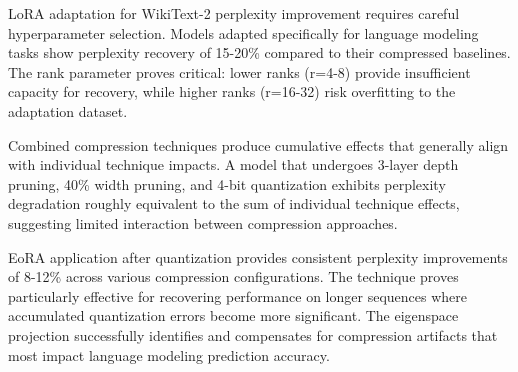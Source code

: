 LoRA adaptation for WikiText-2 perplexity improvement requires careful hyperparameter selection. Models adapted specifically for language modeling tasks show perplexity recovery of 15-20\% compared to their compressed baselines. The rank parameter proves critical: lower ranks (r=4-8) provide insufficient capacity for recovery, while higher ranks (r=16-32) risk overfitting to the adaptation dataset.

Combined compression techniques produce cumulative effects that generally align with individual technique impacts. A model that undergoes 3-layer depth pruning, 40\% width pruning, and 4-bit quantization exhibits perplexity degradation roughly equivalent to the sum of individual technique effects, suggesting limited interaction between compression approaches.

EoRA application after quantization provides consistent perplexity improvements of 8-12\% across various compression configurations. The technique proves particularly effective for recovering performance on longer sequences where accumulated quantization errors become more significant. The eigenspace projection successfully identifies and compensates for compression artifacts that most impact language modeling prediction accuracy.